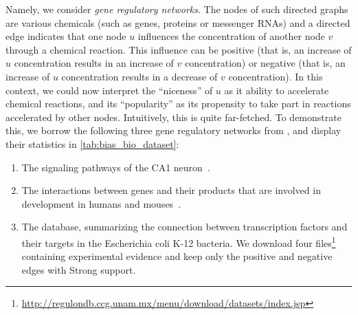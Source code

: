Namely, we consider \emph{gene regulatory networks}. The nodes of such directed graphs are various
chemicals (such as genes, proteins or messenger RNAs) and a directed edge \euv{} indicates that one
node $u$ influences the concentration of another node $v$ through a chemical reaction. This
influence can be positive (that is, an increase of $u$ concentration results in an increase of $v$
concentration) or negative (that is, an increase of $u$ concentration results in a decrease of $v$
concentration). In this context, we could now interpret the \enquote{niceness} of $u$ as it ability
to accelerate chemical reactions, and its \enquote{popularity} as its propensity to take part in
reactions accelerated by other nodes. Intuitively, this is quite far-fetched. To demonstrate this,
we borrow the following three gene regulatory networks from \autocite[Table 1]{BioSigned09}, and
display their statistics in \autoref{tab:bias_bio_dataset}:
\begin{enumerate}[1.]
  \item The signaling pathways of the \hip{} CA1 neuron~\autocite{Hippocamp05}.
  \item The interactions between genes and their products that are involved in \can{} development in
    humans and mouses~\autocite{Cancer07}.
  \item The \reg{} database\autocite{RegulonDB16}, summarizing the connection between transcription
    factors and their targets in the Escherichia coli K-12 bacteria. We download four
    files\footnote{\url{http://regulondb.ccg.unam.mx/menu/download/datasets/index.jsp}} containing
    experimental evidence and keep only the positive and negative edges with \textsf{Strong}
    support.
\end{enumerate}

